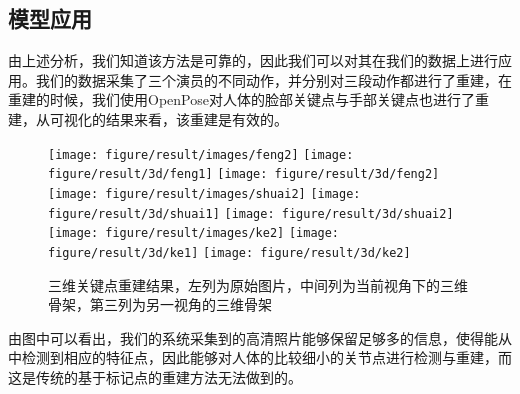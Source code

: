 
\subsection{模型应用}

由上述分析，我们知道该方法是可靠的，因此我们可以对其在我们的数据上进行应用。我们的数据采集了三个演员的不同动作，并分别对三段动作都进行了重建，在重建的时候，我们使用OpenPose对人体的脸部关键点与手部关键点也进行了重建，从可视化的结果来看，该重建是有效的。

\begin{figure}[H]
    \centering
    \texttt{[image: figure/result/images/feng2]} \hfill
    \texttt{[image: figure/result/3d/feng1]} \hfill
    \texttt{[image: figure/result/3d/feng2]} \hfill
    \texttt{[image: figure/result/images/shuai2]} \hfill
    \texttt{[image: figure/result/3d/shuai1]} \hfill
    \texttt{[image: figure/result/3d/shuai2]} \hfill
    \texttt{[image: figure/result/images/ke2]} \hfill
    \texttt{[image: figure/result/3d/ke1]} \hfill
    \texttt{[image: figure/result/3d/ke2]} 
    \caption{三维关键点重建结果，左列为原始图片，中间列为当前视角下的三维骨架，第三列为另一视角的三维骨架\label{fig:3djoint}}
  \end{figure}

由图中可以看出，我们的系统采集到的高清照片能够保留足够多的信息，使得能从中检测到相应的特征点，因此能够对人体的比较细小的关节点进行检测与重建，而这是传统的基于标记点的重建方法无法做到的。

